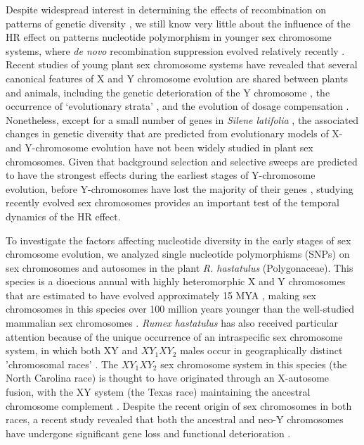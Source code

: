 \documentclass[9pt,twocolumn,twoside]{gsajnl}
\begin{document}
Despite widespread interest in determining the effects of recombination on patterns of genetic diversity \citep{ellegren2011,bachtrog2013NRG}, we still know very little about the influence of the HR effect on patterns nucleotide polymorphism in younger sex chromosome systems, where \textit{de novo} recombination suppression evolved relatively recently \citep{charlesworth2016plant}. Recent studies of young plant sex chromosome systems have revealed that several canonical features of X and Y chromosome evolution are shared between plants and animals, including the genetic deterioration of the Y chromosome \citep{bergero2015,hough2014}, the occurrence of ‘evolutionary strata’ \citep{bergero2009}, and the evolution of dosage compensation \citep{muyle2012,papadopulos2015}. Nonetheless, except for a small number of genes in \textit{Silene latifolia} \citep{filatov2001diversity,qiu2010nucleotide}, the associated changes in genetic diversity that are predicted from evolutionary models of X- and Y-chromosome evolution have not been widely studied in plant sex chromosomes. Given that background selection and selective sweeps are predicted to have the strongest effects during the earliest stages of Y-chromosome evolution, before Y-chromosomes have lost the majority of their genes \citep{bachtrog2008temporal}, studying recently evolved sex chromosomes provides an important test of the temporal dynamics of the HR effect.

To investigate the factors affecting nucleotide diversity in the early stages of sex chromosome evolution, we analyzed single nucleotide polymorphisms (SNPs) on sex chromosomes and autosomes in the plant \textit{R. hastatulus }(Polygonaceae). This species is a dioecious annual with highly heteromorphic X and Y chromosomes that are estimated to have evolved  approximately 15 MYA \citep{quesada2011,grabowska2015,navajas2005}, making sex chromosomes in this species over 100 million years younger than the well-studied mammalian sex chromosomes \citep{lahn1999,ross2005dna}. \textit{Rumex hastatulus} has also received particular attention because of the unique occurrence of an intraspecific sex chromosome system, in which both XY and $XY_{1}XY_{2}$ males occur in geographically distinct 'chromosomal races' \citep{smith1963mechanism}. The $XY_{1}XY_{2}$ sex chromosome system in this species (the North Carolina race) is thought to have originated through an X-autosome fusion, with the XY system (the Texas race) maintaining the ancestral chromosome complement \citep{smith1964evolving}. Despite the recent origin of sex chromosomes in both races, a recent study revealed that both the ancestral and neo-Y chromosomes have undergone significant gene loss and functional deterioration \citep{hough2014}.
\end{document}
